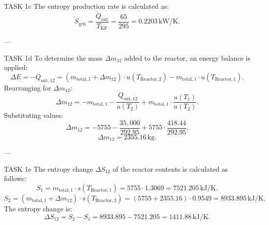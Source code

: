 TASK 1c  
The entropy production rate is calculated as:  
\[
\dot{S}_{\text{gen}} = \frac{\dot{Q}_{\text{out}}}{T_{\text{KF}}} = \frac{65}{295} = 0.2203 \, \text{kW/K}.
\]

---

TASK 1d  
To determine the mass \( \Delta m_{12} \) added to the reactor, an energy balance is applied:  
\[
\Delta E = -Q_{\text{out},12} = (m_{\text{total},1} + \Delta m_{12}) \cdot u(T_{\text{Reactor},2}) - m_{\text{total},1} \cdot u(T_{\text{Reactor},1}).
\]  
Rearranging for \( \Delta m_{12} \):  
\[
\Delta m_{12} = -m_{\text{total},1} - \frac{Q_{\text{out},12}}{u(T_2)} + m_{\text{total},1} \cdot \frac{u(T_1)}{u(T_2)}.
\]  
Substituting values:  
\[
\Delta m_{12} = -5755 - \frac{35,000}{292.95} + 5755 \cdot \frac{418.44}{292.95}.
\]  
\[
\Delta m_{12} = 2355.16 \, \text{kg}.
\]

---

TASK 1e  
The entropy change \( \Delta S_{12} \) of the reactor contents is calculated as follows:  
\[
S_1 = m_{\text{total},1} \cdot s(T_{\text{Reactor},1}) = 5755 \cdot 1.3069 = 7521.205 \, \text{kJ/K}.
\]  
\[
S_2 = (m_{\text{total},1} + \Delta m_{12}) \cdot s(T_{\text{Reactor},2}) = (5755 + 2355.16) \cdot 0.9549 = 8933.895 \, \text{kJ/K}.
\]  
The entropy change is:  
\[
\Delta S_{12} = S_2 - S_1 = 8933.895 - 7521.205 = 1411.88 \, \text{kJ/K}.
\]